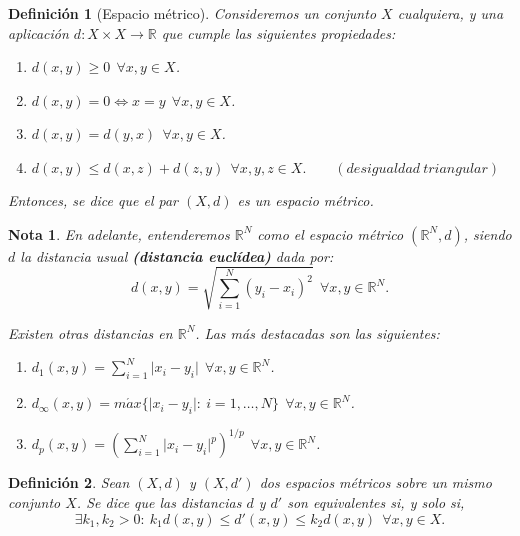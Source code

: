 \documentclass[11pt, a4paper, titlepage]{article}
\providecommand{\abs}[1]{\lvert#1\rvert}
\theoremstyle{theorem-style}
\theoremstyle{definition-style}
\newtheorem*{ndef}{Definición}
\theoremstyle{remark-style}
\newtheorem*{nota}{Nota}
\theoremstyle{example-style}
\newenvironment{nlist}
{\begin{enumerate}
\renewcommand\labelenumi{(\emph{\roman{enumi})}}}
{\end{enumerate}}
\begin{document}
\begin{ndef}[Espacio métrico]
Consideremos un conjunto $X$ cualquiera, y una aplicación \mbox{$d:X\times X \longrightarrow \mathbb{R}$} que cumple las siguientes propiedades:

\begin{nlist}
\item $d(x,y) \ge 0\ \ \forall x,y \in X$.

\item $d(x,y) = 0 \iff x = y\ \ \forall x,y \in X$.

\item $d(x,y) = d(y,x)\ \ \forall x,y \in X$.

\item $d(x,y) \leq d(x,z) + d(z,y)\ \ \forall x,y,z \in X. \quad \quad(desigualdad\ triangular)$

\end{nlist}

Entonces, se dice que el par $(X,d)$ es un \emph{espacio métrico}.
\end{ndef}



\begin{nota}
En adelante, entenderemos $\mathbb{R}^N$ como el espacio métrico $(\mathbb{R}^N,d)$, siendo $d$ la distancia usual \textbf{(distancia euclídea)} dada por: $$d(x,y) = \sqrt{\sum_{i=1}^N (y_i - x_i)^2}\ \ \forall x,y\in \mathbb{R}^N.$$

Existen otras distancias en $\mathbb{R}^N$. Las más destacadas son las siguientes:

\begin{nlist}
\item $\displaystyle d_1(x,y) = \sum_{i=1}^N \abs{x_i - y_i}\ \ \forall x,y \in \mathbb{R}^N$.

\item $\displaystyle d_{\infty}(x,y) = m\acute{a}x \{\abs{x_i - y_i}: \ i=1,\dots,N \}\ \ \forall x,y\in \mathbb{R}^N$.

\item $\displaystyle d_p(x,y) = \left( \sum_{i=1}^N \abs{x_i - y_i}^p \right)^{1/p}\ \ \forall x,y\in \mathbb{R}^N$.\\
\end{nlist}

\end{nota}



\begin{ndef}
Sean $(X,d)$ y $(X,d')$ dos espacios métricos sobre un mismo conjunto $X$. Se dice que las distancias $d$ y $d'$ son \textit{equivalentes} si, y solo si, $$\exists k_1,k_2 > 0 :\ k_1d(x,y)\le d'(x,y) \le k_2d(x,y)\ \ \forall x,y\in X.$$
\end{ndef}
\end{document}
